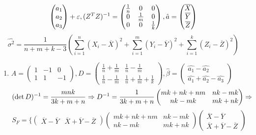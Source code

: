 {{\[\begin{pmatrix}
  a_1 \\ a_2 \\ a_3 
  \end{pmatrix} + \varepsilon, (Z^TZ)^{-1} = 
  \begin{pmatrix}
  \frac{1}{n} & 0 & 0 \\
  0 & \frac{1}{m} & 0 \\
  0 & 0 & \frac{1}{k}
  \end{pmatrix},
  \hat{a} = \begin{pmatrix} \overline{X} \\ \overline{Y} \\ \overline{Z} \end{pmatrix}
  \]
  \[\hat{\sigma^2} = \frac{1}{n + m + k - 3}\left(\sum_{i = 1}^n (X_i - \overline{X})^2 + \sum_{i = 1}^m (Y_i - \overline{Y})^2 + \sum_{i = 1}^k (Z_i - \overline{Z})^2\right)\]
  \begin{enumerate}[label=\alph*]
    \item $A = 
    \begin{pmatrix}
    1 & -1 & 0\\
    1 & 1 & -1
    \end{pmatrix},
    D =
    \begin{pmatrix}
    \frac{1}{n} + \frac{1}{m} & \frac{1}{n} - \frac{1}{m} \\
    \frac{1}{n} - \frac{1}{m} & \frac{1}{n} + \frac{1}{m} + \frac{1}{k}
    \end{pmatrix}, \hat{\beta} =
    \begin{pmatrix}
    \hat{a_1} - \hat{a_2} \\
    \hat{a_1} + \hat{a_2} - \hat{a_3}
    \end{pmatrix}
    $
    \[
    (\det D)^{-1} = \frac{mnk}{3k + m + n} \Rightarrow D^{-1} = \frac{1}{3k + m + n}
    \begin{pmatrix}
    mk + nk + nm & nk - mk \\
    nk - mk & mk + nk 
    \end{pmatrix} \Rightarrow 
    \]
    \[S_{F} = 
    \{
    \begin{pmatrix}
    \overline{X} - \overline{Y} & \overline{X} + \overline{Y} - \overline{Z}
    \end{pmatrix}
    \begin{pmatrix}
    mk + nk + nm & nk - mk \\
    nk - mk & mk + nk 
    \end{pmatrix}
        \begin{pmatrix}
    \overline{X} - \overline{Y} \\ \overline{X} + \overline{Y} - \overline{Z}

\end{pmatrix}\]
\end{enumerate}}}
